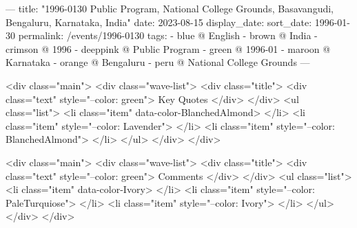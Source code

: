 ---
title: "1996-0130 Public Program, National College Grounds, Basavangudi, Bengaluru, Karnataka, India"
date: 2023-08-15
display_date: 
sort_date: 1996-01-30
permalink: /events/1996-0130
tags:
  - blue @ English
  - brown @ India
  - crimson @ 1996
  - deeppink @ Public Program
  - green @ 1996-01
  - maroon @ Karnataka
  - orange @ Bengaluru
  - peru @ National College Grounds
---

<div class="main">
  <div class="wave-list">
    <div class="title">
      <div class="text" style="--color: green">
        Key Quotes
      </div>
    </div>
    <ul class="list">
        <li class="item" data-color-BlanchedAlmond>
        </li>
        <li class="item" style="--color: Lavender">
        </li>
        <li class="item" style="--color: BlanchedAlmond">
        </li>
      </ul>
  </div>
</div>

<div class="main">
  <div class="wave-list">
    <div class="title">
      <div class="text" style="--color: green">
        Comments
      </div>
    </div>
    <ul class="list">
        <li class="item" data-color-Ivory>
        </li>
        <li class="item" style="--color: PaleTurquiose">
        </li>
        <li class="item" style="--color: Ivory">
        </li>
      </ul>
  </div>
</div>